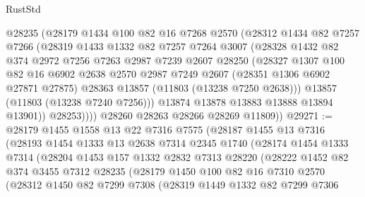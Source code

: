 \begin{lexlean}{RustStd}
\begin{coremodule}
              @28235
              (@28179
                @1434
                @100
                @82
                @16
                @7268
                @2570
                (@28312
                  @1434
                  @82
                  @7257
                  @7266
                  (@28319
                    @1433
                    @1332
                    @82
                    @7257
                    @7264
                    @3007
                    (@28328
                      @1432
                      @82
                      @374
                      @2972
                      @7256
                      @7263
                      @2987
                      @7239
                      @2607
                      @28250
                      (@28327
                        @1307
                        @100
                        @82
                        @16
                        @6902
                        @2638
                        @2570
                        @2987
                        @7249
                        @2607
                        (@28351 @1306 @6902 @27871 @27875)
                        @28363
                        @13857
                        (@11803 (@13238 @7250 @2638)))
                      @13857
                      (@11803 (@13238 @7240 @7256)))
                    @13874
                    @13878
                    @13883
                    @13888
                    @13894
                    @13901))
                @28253))))
        @28260
        @28263
        @28266
        @28269
        @11809))
@29271 := @28179
    @1455
    @1558
    @13
    @22
    @7316
    @7575
    (@28187
      @1455
      @13
      @7316
      (@28193
        @1454
        @1333
        @13
        @2638
        @7314
        @2345
        @1740
        (@28174
          @1454
          @1333
          @7314
          (@28204
            @1453
            @157
            @1332
            @2832
            @7313
            @28220
            (@28222
              @1452
              @82
              @374
              @3455
              @7312
              @28235
              (@28179
                @1450
                @100
                @82
                @16
                @7310
                @2570
                (@28312
                  @1450
                  @82
                  @7299
                  @7308
                  (@28319
                    @1449
                    @1332
                    @82
                    @7299
                    @7306

\end{coremodule}
\end{lexlean}
